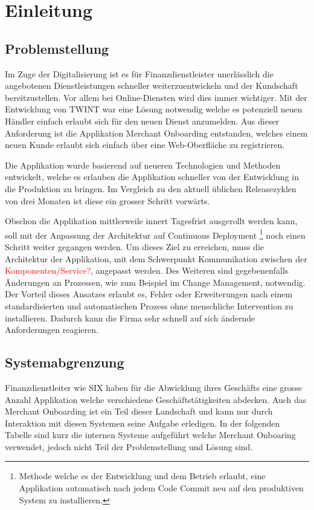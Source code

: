 \chapter{Einleitung}

\section{Problemstellung}

Im Zuge der Digitalisierung ist es für Finanzdienstleister unerlässlich die angebotenen Dienstleistungen schneller weiterzuentwickeln und der Kundschaft bereitzustellen. Vor allem bei Online-Diensten wird dies immer wichtiger. Mit der Entwicklung von TWINT war eine Lösung notwendig welche es potenziell neuen Händler einfach erlaubt sich für den neuen Dienst anzumelden. Aus dieser Anforderung ist die Applikation Merchant Onboarding entstanden, welches einem neuen Kunde erlaubt sich einfach über eine Web-Oberfläche zu registrieren.

Die Applikation wurde basierend auf neueren Technologien und Methoden entwickelt, welche es erlauben die Applikation schneller von der Entwicklung in die Produktion zu bringen. Im Vergleich zu den aktuell üblichen Releasezyklen von drei Monaten ist diese ein grosser Schritt vorwärts.

Obschon die Applikation mittlerweile innert Tagesfrist ausgerollt werden kann, soll mit der Anpassung der Architektur auf Continuous Deployment \footnote{Methode welche es der Entwicklung und dem Betrieb erlaubt, eine Applikation automatisch nach jedem Code Commit neu auf den produktiven System zu installieren.} noch einen Schritt weiter gegangen werden. Um dieses Ziel zu erreichen, muss die Architektur der Applikation, mit dem Schwerpunkt Kommunikation zwischen der \textcolor{red} {Komponenten/Service?}, angepasst werden. Des Weiteren sind gegebenenfalls Änderungen an Prozessen, wie zum Beispiel im Change Management, notwendig.
Der Vorteil dieses Ansatzes erlaubt es, Fehler oder Erweiterungen nach einem standardisierten und automatischen Prozess ohne menschliche Intervention zu installieren. Dadurch kann die Firma sehr schnell auf sich ändernde Anforderungen reagieren.


\section{Systemabgrenzung}
\label{Abgrenzung}

Finanzdienstleiter wie SIX haben für die Abwicklung ihres Geschäfts eine grosse Anzahl Applikation welche verschiedene Geschäftstätigkeiten abdecken. Auch das Merchant Onboarding ist ein Teil dieser Landschaft und kann nur durch Interaktion mit diesen Systemen seine Aufgabe erledigen. In der folgenden Tabelle sind kurz die internen Systeme aufgeführt welche Merchant Onboaring verwendet, jedoch nicht Teil der Problemstellung und Lösung sind.

